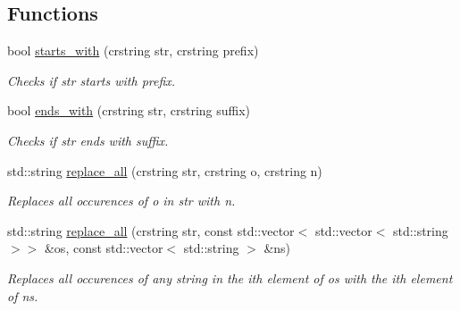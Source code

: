 \subsection*{Functions}
\begin{DoxyCompactItemize}
\item 
\mbox{\label{namespacenta_1_1utils_a9ad5fe63f14dd42c0db25d71e101e85c}} 
bool \hyperlink{namespacenta_1_1utils_a9ad5fe63f14dd42c0db25d71e101e85c}{starts\+\_\+with} (crstring str, crstring prefix)
\begin{DoxyCompactList}\small\item\em Checks if str starts with prefix. \end{DoxyCompactList}\item 
\mbox{\label{namespacenta_1_1utils_aa31e7ef45edfc4fdb60b6459e86b519c}} 
bool \hyperlink{namespacenta_1_1utils_aa31e7ef45edfc4fdb60b6459e86b519c}{ends\+\_\+with} (crstring str, crstring suffix)
\begin{DoxyCompactList}\small\item\em Checks if str ends with suffix. \end{DoxyCompactList}\item 
\mbox{\label{namespacenta_1_1utils_acad0765e34bce437d37871dcf88a9099}} 
std\+::string \hyperlink{namespacenta_1_1utils_acad0765e34bce437d37871dcf88a9099}{replace\+\_\+all} (crstring str, crstring o, crstring n)
\begin{DoxyCompactList}\small\item\em Replaces all occurences of o in str with n. \end{DoxyCompactList}\item 
\mbox{\label{namespacenta_1_1utils_ac35b6baec75cd7b9d9ab7532cc2f9320}} 
std\+::string \hyperlink{namespacenta_1_1utils_ac35b6baec75cd7b9d9ab7532cc2f9320}{replace\+\_\+all} (crstring str, const std\+::vector$<$ std\+::vector$<$ std\+::string $>$$>$ \&os, const std\+::vector$<$ std\+::string $>$ \&ns)
\begin{DoxyCompactList}\small\item\em Replaces all occurences of any string in the ith element of os with the ith element of ns. \end{DoxyCompactList}\item 
\mbox{\label{namespacenta_1_1utils_a5dcdd9caf6995a33370beb952759866f}} 
$$
\end{DoxyCompactItemize}
